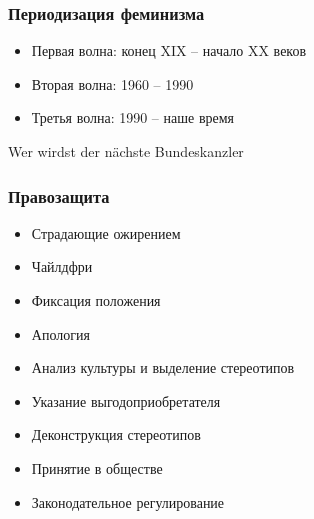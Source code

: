 \documentclass[aspectratio=169]{beamer}
\begin{document}
\begin{bframe}\frametitle{Периодизация феминизма}
\begin{itemize}
\item<+-> Первая волна: конец XIX -- начало XX веков
\item<+-> Вторая волна: 1960 -- 1990
\item<+-> Третья волна: 1990 -- наше время
\end{itemize}
\end{bframe}

\begin{bframe}

\begin{center}
Wer wirdst der n\"achste Bundeskanzler
\end{center}
\end{bframe}

\begin{bframe}
\begin{center}
\end{center}
\end{bframe}

\begin{frame}\frametitle{Правозащита}


\begin{itemize}
\item<+-> Страдающие ожирением
\item<+-> Чайлдфри
\end{itemize}

\begin{itemize}
\item<+-> Фиксация положения
\item<+-> Апология
\item<+-> Анализ культуры и выделение стереотипов
\item<+-> Указание выгодоприобретателя
\item<+-> Деконструкция стереотипов
\item<+-> Принятие в обществе
\item<+-> Законодательное регулирование
\end{itemize}

\end{frame}
\end{document}
